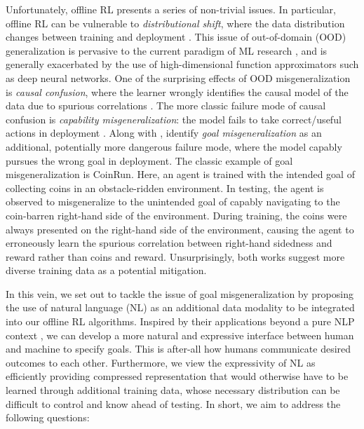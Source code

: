 \documentclass[../main.tex]{subfiles}
\begin{document}
Unfortunately, offline RL presents a series of non-trivial issues. In particular, offline RL can be
vulnerable to \textit{distributional shift}, where the data distribution changes between training
and deployment \citep{quinonero-candela_dataset_2008}. This issue of out-of-domain (OOD)
generalization \citep{shen_towards_2021} is pervasive to the current paradigm of ML research
\citep{arjovsky_out_2020}, and is generally exacerbated by the use of high-dimensional function
approximators such as deep neural networks. One of the surprising effects of OOD misgeneralization
is \textit{causal confusion}, where the learner wrongly identifies the causal model of the data due
to spurious correlations \citep{de_haan_causal_2019}. The more classic  failure mode of causal
confusion is \textit{capability misgeneralization}: the model fails to take correct/useful actions
in deployment \citep{gupta_can_2022, tien_study_2022}. Along with \citet{shah_goal_2022},
\citet{langosco_goal_2022} identify \textit{goal misgeneralization} as an additional, potentially
more dangerous failure mode, where the model capably pursues the wrong goal in deployment. The
classic example of goal misgeneralization is CoinRun. Here, an agent is trained with the intended
goal of collecting coins in an obstacle-ridden environment. In testing, the agent is observed to
misgeneralize to the unintended goal of capably navigating to the coin-barren right-hand side of the
environment. During training, the coins were always presented on the right-hand side of the
environment, causing the agent to erroneously learn the spurious correlation between right-hand
sidedness and reward rather than coins and reward. Unsurprisingly, both works suggest more diverse
training data as a potential mitigation.

In this vein, we set out to tackle the issue of goal misgeneralization by proposing the use of
natural language (NL) as an additional data modality to be integrated into our offline RL
algorithms. Inspired by their applications beyond a pure NLP context \citep{dosovitskiy_image_2022,
ramesh_hierarchical_2022, rombach_high-resolution_2022}, we can develop a more natural and
expressive interface between human and machine to specify goals. This is after-all how humans
communicate desired outcomes to each other. Furthermore, we view the expressivity of NL as
efficiently providing compressed representation that would otherwise have to be learned through
additional training data, whose necessary distribution can be difficult to control and know ahead of
testing. In short, we aim to address the following questions:
\end{document}
